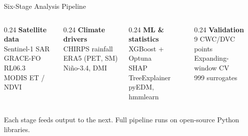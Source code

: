 \documentclass[10pt]{beamer}
\begin{document}
\begin{frame}{Six-Stage Analysis Pipeline}
  \smallskip
  \begin{columns}[T]
    \begin{column}{0.24\textwidth}
      \centering\small\textbf{Satellite data}\\[2pt]
      \footnotesize
      Sentinel-1 SAR\\GRACE-FO RL06.3\\MODIS ET / NDVI
    \end{column}
    \begin{column}{0.24\textwidth}
      \centering\small\textbf{Climate drivers}\\[2pt]
      \footnotesize
      CHIRPS rainfall\\ERA5 (PET, SM)\\Ni\~{n}o-3.4, DMI
    \end{column}
    \begin{column}{0.24\textwidth}
      \centering\small\textbf{ML \& statistics}\\[2pt]
      \footnotesize
      XGBoost + Optuna\\SHAP TreeExplainer\\pyEDM, hmmlearn
    \end{column}
    \begin{column}{0.24\textwidth}
      \centering\small\textbf{Validation}\\[2pt]
      \footnotesize
      9 CWC/DVC points\\Expanding-window CV\\999 surrogates
    \end{column}
  \end{columns}

  \smallskip
  {\footnotesize\centering
  Each stage feeds output to the next.
  Full pipeline runs on open-source Python libraries.\par}
\end{frame}
\end{document}
